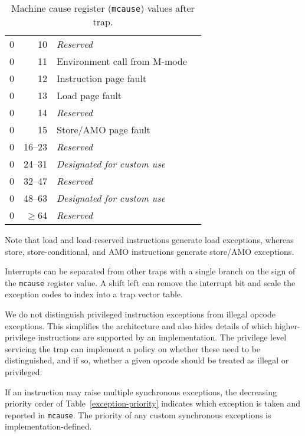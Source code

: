 \begin{table*}[htbp]
\begin{center}
\begin{tabular}{|r|r|l|l|}
  0         & 10              & {\em Reserved} \\
  0         & 11              & Environment call from M-mode \\
  0         & 12              & Instruction page fault \\
  0         & 13              & Load page fault \\
  0         & 14              & {\em Reserved} \\
  0         & 15              & Store/AMO page fault \\
  0         & 16--23          & {\em Reserved} \\
  0         & 24--31          & {\em Designated for custom use} \\
  0         & 32--47          & {\em Reserved} \\
  0         & 48--63          & {\em Designated for custom use} \\
  0         & $\ge$64         & {\em Reserved} \\
  \hline

\end{tabular}
\end{center}
\caption{Machine cause register ({\tt mcause}) values after trap.}
\label{mcauses}
\end{table*}

Note that load and load-reserved instructions generate load exceptions,
whereas store, store-conditional, and AMO instructions generate store/AMO
exceptions.

\begin{commentary}
Interrupts can be separated from other traps with a single branch on the sign of
the {\tt mcause} register value.  A shift left can remove the
interrupt bit and scale the exception codes to index into a trap
vector table.
\end{commentary}

\begin{commentary}
We do not distinguish privileged instruction exceptions from illegal
opcode exceptions.  This simplifies the architecture and also hides
details of which higher-privilege instructions are supported by an
implementation.  The privilege level servicing the trap can implement
a policy on whether these need to be distinguished, and if so, whether
a given opcode should be treated as illegal or privileged.
\end{commentary}

If an instruction may raise multiple synchronous exceptions, the
decreasing priority order of Table~\ref{exception-priority}
indicates which exception is taken and reported in {\tt mcause}.
The priority of any custom synchronous exceptions is implementation-defined.

